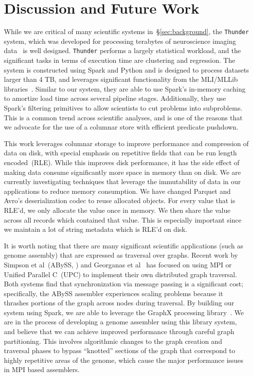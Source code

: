 \documentclass{acm_proc_article-sp}
\begin{document}
\section{Discussion and Future Work}
\label{sec:discussion-future-work}

While we are critical of many scientific systems in~\S\ref{sec:background}, the \texttt{Thunder} system,
which was developed for processing terabytes of neuroscience imaging data~\cite{freeman14} is well
designed. \texttt{Thunder} performs a largely statistical workload, and the significant tasks in terms of
execution time are clustering and regression. The system is constructed using Spark and Python and is
designed to process datasets larger than 4 TB, and leverages significant functionality from the MLI/MLLib
libraries~\cite{sparks13}. Similar to our system, they are able to use Spark's in-memory caching to
amortize load time across several pipeline stages. Additionally, they use Spark's filtering primitives to
allow scientists to cut problems into subproblems. This is a common trend across scientific analyses, and
is one of the reasons that we advocate for the use of a columnar store with efficient predicate pushdown.

This work leverages columnar storage to improve performance and compression of data on disk,
with special emphasis on repetitive fields that can be run length encoded~(RLE). While this improves
disk performance, it has the side effect of making data consume significantly more space in memory
than on disk. We are currently investigating techniques that leverage the immutability of data in our
applications to reduce memory consumption. We have changed Parquet and Avro's deserialization codec
to reuse allocated objects. For every value that is RLE'd, we only allocate the value once in memory. We
then share the value across all records which contained that value. This is especially important since we
maintain a lot of string metadata which is RLE'd on disk.

It is worth noting that there are many significant scientific applications (such as genome
assembly) that are expressed as traversal over graphs. Recent work by Simpson et al~(ABySS,
\cite{simpson09}) and Georganas et al~\cite{georganas14} has focused on using MPI
or Unified Parallel C~(UPC) to implement their own distributed graph traversal. Both systems
find that synchronization via message passing is a significant cost; specifically, the ABySS assembler
experiences scaling problems because it thrashes portions of the graph across nodes during traversal.
By building our system using Spark, we are able to leverage the GraphX processing library~\cite{xin13,
gonzalez14}. We are in the process of developing a genome assembler using this library system, and
believe that we can achieve improved performance through careful graph partitioning. This involves
algorithmic changes to the graph creation and traversal phases to bypass ``knotted'' sections of the
graph that correspond to highly repetitive areas of the genome, which cause the major performance
issues in MPI based assemblers.
\end{document}
